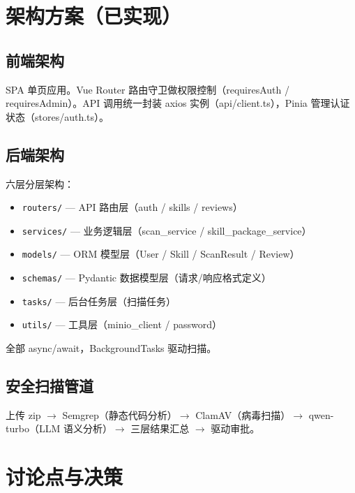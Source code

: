 \documentclass[11pt,a4paper]{article}
\begin{document}
\section{架构方案（已实现）}

\subsection{前端架构}

SPA 单页应用。Vue Router 路由守卫做权限控制（requiresAuth / requiresAdmin）。API 调用统一封装 axios 实例（api/client.ts），Pinia 管理认证状态（stores/auth.ts）。

\subsection{后端架构}

六层分层架构：
\begin{itemize}[nosep]
  \item \texttt{routers/} — API 路由层（auth / skills / reviews）
  \item \texttt{services/} — 业务逻辑层（scan\_service / skill\_package\_service）
  \item \texttt{models/} — ORM 模型层（User / Skill / ScanResult / Review）
  \item \texttt{schemas/} — Pydantic 数据模型层（请求/响应格式定义）
  \item \texttt{tasks/} — 后台任务层（扫描任务）
  \item \texttt{utils/} — 工具层（minio\_client / password）
\end{itemize}

全部 async/await，BackgroundTasks 驱动扫描。

\subsection{安全扫描管道}

上传 zip $\to$ Semgrep（静态代码分析）$\to$ ClamAV（病毒扫描）$\to$ qwen-turbo（LLM 语义分析）$\to$ 三层结果汇总 $\to$ 驱动审批。

\section{讨论点与决策}
\end{document}
